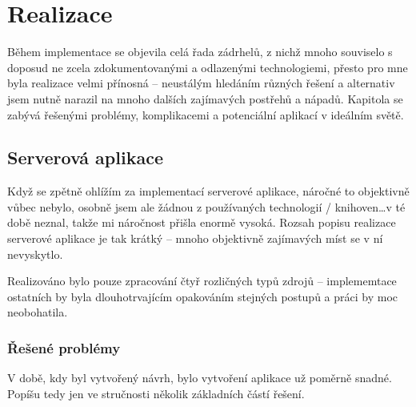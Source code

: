 
\chapter{Realizace}
Během implementace se objevila celá řada zádrhelů, z nichž mnoho souviselo s doposud ne zcela zdokumentovanými a odlazenými technologiemi, přesto pro mne byla realizace velmi přínosná -- neustálým hledáním různých řešení a alternativ jsem nutně narazil na mnoho dalších zajímavých postřehů a nápadů. Kapitola se zabývá řešenými problémy, komplikacemi a potenciální aplikací v ideálním světě. %

\section{Serverová aplikace}
Když se zpětně ohlížím za implementací serverové aplikace, náročné to objektivně vůbec nebylo, osobně jsem ale žádnou z používaných technologií / knihoven\dots v té době neznal, takže mi náročnost přišla enormě vysoká. Rozsah popisu realizace serverové aplikace je tak krátký -- mnoho objektivně zajímavých míst se v ní nevyskytlo.

Realizováno bylo pouze zpracování čtyř rozličných typů zdrojů -- implememtace ostatních by byla dlouhotrvajícím opakováním stejných postupů a práci by moc neobohatila.

\subsection{Řešené problémy}
V době, kdy byl vytvořený návrh, bylo vytvoření aplikace už poměrně snadné. Popíšu tedy jen ve stručnosti několik základních částí řešení.

